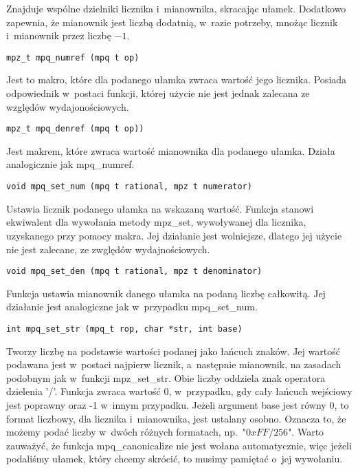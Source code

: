 Znajduje wspólne dzielniki licznika i~mianownika, skracając ułamek. Dodatkowo zapewnia, że mianownik jest liczbą dodatnią, w~razie potrzeby, mnożąc licznik i~mianownik przez liczbę $-1$.

\begin{lstlisting}
mpz_t mpq_numref (mpq t op)
\end{lstlisting}

Jest to makro, które dla podanego ułamka zwraca wartość jego licznika. Posiada odpowiednik w~postaci funkcji, której użycie nie jest jednak zalecana ze względów wydajonościowych.

\begin{lstlisting}
mpz_t mpq_denref (mpq t op))
\end{lstlisting}

Jest makrem, które zwraca wartość mianownika dla podanego ułamka. Działa analogicznie jak mpq\_numref.

\begin{lstlisting}
void mpq_set_num (mpq t rational, mpz t numerator)
\end{lstlisting}

Ustawia licznik podanego ułamka na wskazaną wartość. Funkcja stanowi ekwiwalent dla wywołania metody mpz\_set, wywoływanej dla licznika, uzyskanego przy pomocy makra. Jej działanie jest wolniejsze, dlatego jej użycie nie jest zalecane, ze zwględów wydajnościowych.

\begin{lstlisting}
void mpq_set_den (mpq t rational, mpz t denominator)
\end{lstlisting}
Funkcja ustawia mianownik danego ułamka na podaną liczbę całkowitą. Jej działanie jest analogiczne jak w~przypadku mpq\_set\_num.

\begin{lstlisting}
int mpq_set_str (mpq_t rop, char *str, int base)
\end{lstlisting}

Tworzy liczbę na podstawie wartości podanej jako łańcuch znaków. Jej wartość podawana jest w~postaci najpierw licznik, a~następnie mianownik, na zasadach podobnym jak w~funkcji mpz\_set\_str. Obie liczby oddziela znak operatora dzielenia '/'. Funkcja zwraca wartość $0$, w~przypadku, gdy cały łańcuch wejściowy jest poprawny oraz -1 w~innym przypadku. Jeżeli argument base jest równy $0$, to format liczbowy, dla licznika i~mianownika, jest ustalany osobno. Oznacza to, że możemy podać liczby w~dwóch różnych formatach, np.\ "$0xFF/256$". Warto zauważyć, że funkcja mpq\_canonicalize nie jest wołana automatycznie, więc jeżeli podaliśmy ułamek, który chcemy skrócić, to musimy pamiętać o~jej wywołaniu.

